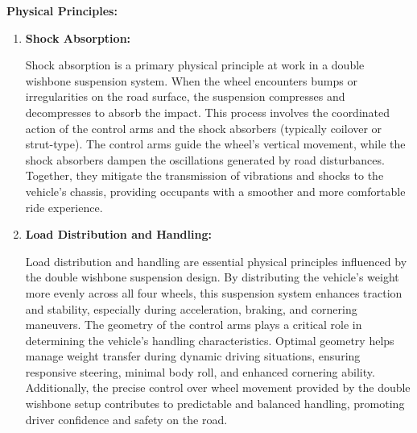\textbf{Physical Principles:}

\begin{enumerate}
    \item \textbf{Shock Absorption:}
    
    Shock absorption is a primary physical principle at work in a double wishbone suspension system. When the wheel encounters bumps or irregularities on the road surface, the suspension compresses and decompresses to absorb the impact. This process involves the coordinated action of the control arms and the shock absorbers (typically coilover or strut-type). The control arms guide the wheel's vertical movement, while the shock absorbers dampen the oscillations generated by road disturbances. Together, they mitigate the transmission of vibrations and shocks to the vehicle's chassis, providing occupants with a smoother and more comfortable ride experience.
    
    \item \textbf{Load Distribution and Handling:}
    
    Load distribution and handling are essential physical principles influenced by the double wishbone suspension design. By distributing the vehicle's weight more evenly across all four wheels, this suspension system enhances traction and stability, especially during acceleration, braking, and cornering maneuvers. The geometry of the control arms plays a critical role in determining the vehicle's handling characteristics. Optimal geometry helps manage weight transfer during dynamic driving situations, ensuring responsive steering, minimal body roll, and enhanced cornering ability. Additionally, the precise control over wheel movement provided by the double wishbone setup contributes to predictable and balanced handling, promoting driver confidence and safety on the road.
\end{enumerate}

